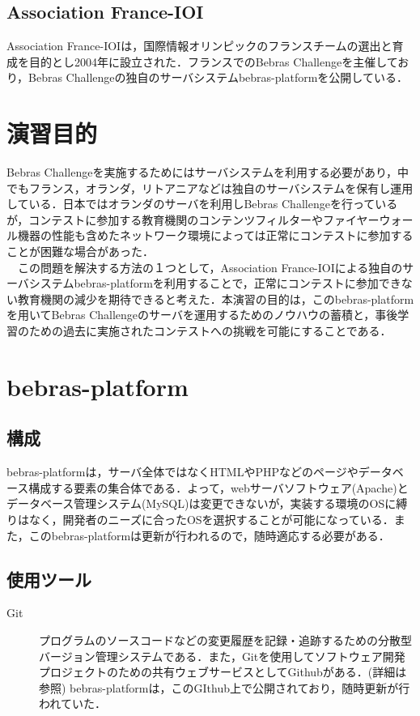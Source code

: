 \documentclass[a4paper]{jarticle}
\begin{document}
\begin{multicols}{2}
\subsection{Association France-IOI}
Association France-IOIは，国際情報オリンピックのフランスチームの選出と育成を目的とし2004年に設立された．フランスでのBebras Challengeを主催しており，Bebras Challengeの独自のサーバシステムbebras-platformを公開している．

\section{演習目的}
Bebras Challengeを実施するためにはサーバシステムを利用する必要があり，中でもフランス，オランダ，リトアニアなどは独自のサーバシステムを保有し運用している．日本ではオランダのサーバを利用しBebras Challengeを行っているが，コンテストに参加する教育機関のコンテンツフィルターやファイヤーウォール機器の性能も含めたネットワーク環境によっては正常にコンテストに参加することが困難な場合があった．
\\　この問題を解決する方法の１つとして，Association France-IOIによる独自のサーバシステムbebras-platformを利用することで，正常にコンテストに参加できない教育機関の減少を期待できると考えた．本演習の目的は，このbebras-platformを用いてBebras Challengeのサーバを運用するためのノウハウの蓄積と，事後学習のための過去に実施されたコンテストへの挑戦を可能にすることである．

\section{bebras-platform}


\subsection{構成}
bebras-platformは，サーバ全体ではなくHTMLやPHPなどのページやデータベース構成する要素の集合体である．よって，webサーバソフトウェア(Apache)とデータベース管理システム(MySQL)は変更できないが，実装する環境のOSに縛りはなく，開発者のニーズに合ったOSを選択することが可能になっている．また，このbebras-platformは更新が行われるので，随時適応する必要がある．

\subsection{使用ツール}
\begin{description}
\item[Git]プログラムのソースコードなどの変更履歴を記録・追跡するための分散型バージョン管理システムである．また，Gitを使用してソフトウェア開発プロジェクトのための共有ウェブサービスとしてGithubがある．(詳細は\cite{git}参照) bebras-platformは，このGIthub上で公開されており，随時更新が行われていた．
\end{description}


\end{multicols}
\end{document}

